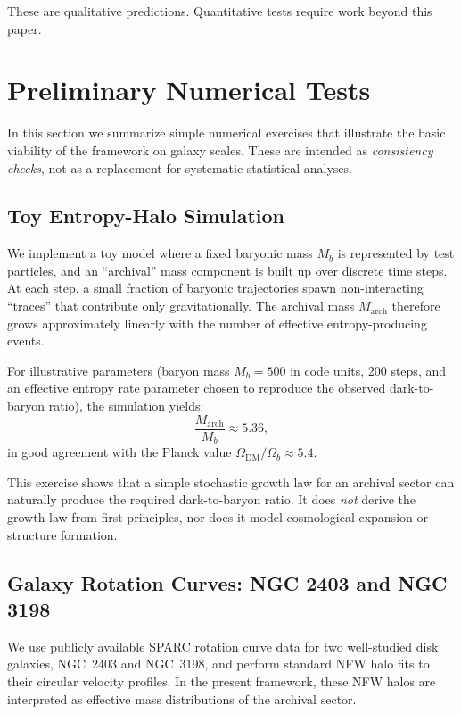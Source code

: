 \documentclass[11pt,a4paper]{article}
\begin{document}
These are qualitative predictions. Quantitative tests require work beyond this paper.

\section{Preliminary Numerical Tests}

In this section we summarize simple numerical exercises that illustrate the basic viability of the framework on galaxy scales. These are intended as \emph{consistency checks}, not as a replacement for systematic statistical analyses.

\subsection{Toy Entropy-Halo Simulation}

We implement a toy model where a fixed baryonic mass $M_b$ is represented by test particles, and an ``archival'' mass component is built up over discrete time steps. At each step, a small fraction of baryonic trajectories spawn non-interacting ``traces'' that contribute only gravitationally. The archival mass $M_{\mathrm{arch}}$ therefore grows approximately linearly with the number of effective entropy-producing events.

For illustrative parameters (baryon mass $M_b = 500$ in code units, 200 steps, and an effective entropy rate parameter chosen to reproduce the observed dark-to-baryon ratio), the simulation yields:
\begin{equation}
\frac{M_{\mathrm{arch}}}{M_b} \approx 5.36,
\end{equation}
in good agreement with the Planck value $\Omega_{\mathrm{DM}}/\Omega_b \approx 5.4$.

This exercise shows that a simple stochastic growth law for an archival sector can naturally produce the required dark-to-baryon ratio. It does \emph{not} derive the growth law from first principles, nor does it model cosmological expansion or structure formation.

\subsection{Galaxy Rotation Curves: NGC 2403 and NGC 3198}

We use publicly available SPARC rotation curve data for two well-studied disk galaxies, NGC~2403 and NGC~3198, and perform standard NFW halo fits to their circular velocity profiles. In the present framework, these NFW halos are interpreted as effective mass distributions of the archival sector.
\end{document}
